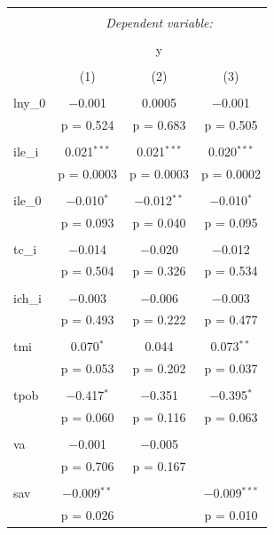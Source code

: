 \begin{table}[!htbp] \centering 
    \tiny
  \caption{} 
  \label{} 
\begin{tabular}{@{\extracolsep{5pt}}lccc} 
\\[-1.8ex]\hline 
\hline \\[-1.8ex] 
 & \multicolumn{3}{c}{\textit{Dependent variable:}} \\ 
\cline{2-4} 
\\[-1.8ex] & \multicolumn{3}{c}{y} \\ 
\\[-1.8ex] & (1)  & (2) & (3)\\ 
\hline \\[-1.8ex] 
 lny\_0 & $-$0.001 & 0.0005 & $-$0.001 \\ 
  & p = 0.524 & p = 0.683 & p = 0.505 \\ 
  & & & \\ 
 ile\_i & 0.021$^{***}$ & 0.021$^{***}$ & 0.020$^{***}$ \\ 
  & p = 0.0003 & p = 0.0003 & p = 0.0002 \\ 
  & & & \\ 
 ile\_0 & $-$0.010$^{*}$ & $-$0.012$^{**}$ & $-$0.010$^{*}$ \\ 
  & p = 0.093 & p = 0.040 & p = 0.095 \\ 
  & & & \\ 
 tc\_i & $-$0.014 & $-$0.020 & $-$0.012 \\ 
  & p = 0.504 & p = 0.326 & p = 0.534 \\ 
  & & & \\ 
 ich\_i & $-$0.003 & $-$0.006 & $-$0.003 \\ 
  & p = 0.493 & p = 0.222 & p = 0.477 \\ 
  & & & \\ 
 tmi & 0.070$^{*}$ & 0.044 & 0.073$^{**}$ \\ 
  & p = 0.053 & p = 0.202 & p = 0.037 \\ 
  & & & \\ 
 tpob & $-$0.417$^{*}$ & $-$0.351 & $-$0.395$^{*}$ \\ 
  & p = 0.060 & p = 0.116 & p = 0.063 \\ 
  & & & \\ 
 va & $-$0.001 & $-$0.005 &  \\ 
  & p = 0.706 & p = 0.167 &  \\ 
  & & & \\ 
 sav & $-$0.009$^{**}$ &  & $-$0.009$^{***}$ \\ 
  & p = 0.026 &  & p = 0.010 \\ 

\end{tabular}
\end{table}
